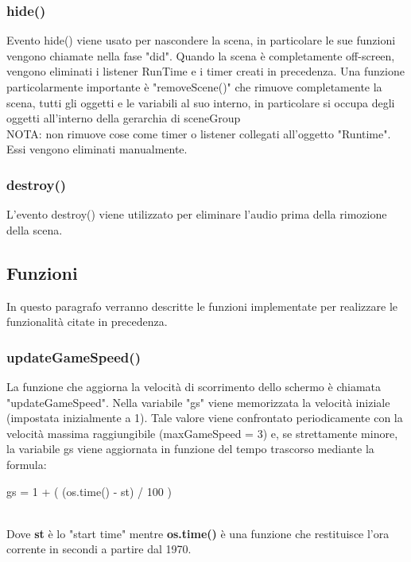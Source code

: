 \documentclass[12pt]{article}
\begin{document}
\subsubsection{hide()}
Evento hide() viene usato per nascondere la scena, in particolare le sue funzioni vengono chiamate nella fase "did". Quando la scena è completamente off-screen, vengono eliminati i listener RunTime e i timer creati in precedenza. Una funzione particolarmente importante è "removeScene()" che rimuove completamente la scena, tutti gli oggetti e le variabili al suo interno,
in particolare si occupa degli oggetti all'interno della gerarchia di sceneGroup 
\\

NOTA: non rimuove cose come timer o listener collegati all'oggetto "Runtime". Essi vengono eliminati manualmente.

\subsubsection{destroy()}
L'evento destroy() viene utilizzato per eliminare l'audio prima della rimozione della scena.

\subsection{Funzioni}
In questo paragrafo verranno descritte le funzioni implementate per realizzare le funzionalità citate in precedenza.
\subsubsection{updateGameSpeed()}
La funzione che aggiorna la velocità di scorrimento dello schermo è chiamata "updateGameSpeed". Nella variabile "gs" viene memorizzata la velocità iniziale (impostata inizialmente a 1). Tale valore viene confrontato periodicamente con la velocità massima raggiungibile (maxGameSpeed = 3) e, se strettamente minore, la variabile gs viene aggiornata in funzione del tempo trascorso mediante la formula:\\

\begin{center}
    gs = 1 + ( (os.time() - st) / 100 )
\end{center}

\\

Dove \textbf{st} è lo "start time" mentre \textbf{os.time()} è una funzione che restituisce l'ora corrente in secondi a partire dal 1970.
\end{document}
